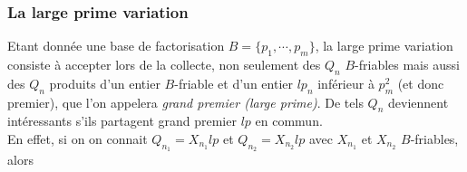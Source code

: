 \subsubsection{La \og large prime variation \fg{}}

Etant donnée une base de factorisation $B = \{ p_1, \cdots, p_m\}$, la \og large
prime variation \fg{} consiste à accepter lors de la collecte, non seulement des 
$Q_n$ $B$-friables mais aussi des $Q_n$ produits d'un entier $B$-friable et d'un
entier $lp_n$ inférieur à $p_m^2$ (et donc premier), que l'on appelera
\emph{grand premier (large prime)}. De tels $Q_n$ deviennent intéressants s'ils partagent 
grand premier $lp$ en commun. \\

En effet, si on on connait $Q_{n_1} = X_{n_1}lp$ et $Q_{n_2} = X_{n_2}lp$ avec $X_{n_1}$ et 
$X_{n_2}$ $B$-friables, alors 
\\ 






